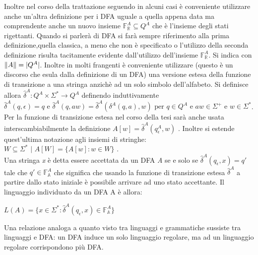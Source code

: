 Inoltre nel corso della trattazione seguendo \cite[p. 72]{DeLaHiguera10} in alcuni casi è conveniente utilizzare anche un'altra definizione per i \ac{DFA} uguale a quella appena data ma comprendente anche un nuovo insieme $\mathbb{F}_{\mathbb{R}}^{A} \subseteq Q^{A}$ che è l'insieme degli stati rigettanti. Quando si parlerà di \ac{DFA} si farà sempre riferimento alla prima definizione,quella classica,  a meno che non è specificato o l'utilizzo della seconda definizione risulta tacitamente evidente dall'utilizzo dell'insieme $\mathbb{F}_{\mathbb{R}}^{A}$. Si indica con $\lVert A\rVert = \lvert Q^{A}\rvert$. 
Inoltre in molti frangenti è conveniente utilizzare (questo è un discorso che esula dalla definizione di un \ac{DFA}) una versione estesa della funzione di transizione a una stringa anzichè ad un solo simbolo dell'alfabeto. Si definisce allora $\hat{\delta}^{A} : Q^{A} \times \Sigma^{*} \to Q^{A}$ definendo induttivamente $\hat{\delta}^{A}(q,\epsilon) = q \text{ e } \hat{\delta}^{A}(q,aw) = \hat{\delta}^{A}(\delta^{A}(q,a),w) \text{ per } q \in Q^{A} \text{ e } aw \in \Sigma^{+} \text{ e } w \in \Sigma^{*}$. Per la funzione di transizione estesa nel corso della tesi sarà anche usata interscambiabilmente la definizione $A[w] = \hat{\delta}^{A}(q_{\epsilon}^{A},w)$ . Inoltre si estende quest'ultima notazione agli insiemi di stringhe: $W \subseteq \Sigma^{*} \text{ | } A[W] = \{A[w] : w \in W\}$ .\\
 
Una stringa \textit{x} è detta essere accettata da un \ac{DFA} \textit{A} se e solo se $\hat{\delta}^{A}(q_\epsilon,x) = q'$ tale che $q' \in \mathbb{F}_\mathbb{A}^{A}$ che significa che usando la funzione di transizione estesa $\hat{\delta}^{A}$ a partire dallo stato iniziale è possibile arrivare ad uno stato accettante.   Il linguaggio individuato da un \ac{DFA} A è allora:\\
\centerline{$L(A) = \{x \in \Sigma^{*} : \hat{\delta}^{A}(q_\epsilon,x) \in \mathbb{F}_\mathbb{A}^{A}\}$}

Una relazione analoga a quanto visto tra linguaggi e grammatiche sussiste tra linguaggi e \ac{DFA}: un \ac{DFA} induce un solo linguaggio regolare, ma ad un linguaggio regolare corrispondono più \ac{DFA}.

